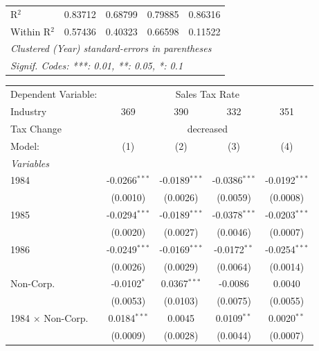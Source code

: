 \documentclass[
  12pt]{article}
\theoremstyle{definition}
\theoremstyle{remark}
\begin{document}
\begin{table}
\begin{minipage}{\linewidth}
\begin{tabular}{lcccc}
   R$^2$                    & 0.83712         & 0.68799        & 0.79885         & 0.86316\\  
   Within R$^2$             & 0.57436         & 0.40323        & 0.66598         & 0.11522\\  
   \midrule \midrule
   \multicolumn{5}{l}{\emph{Clustered (Year) standard-errors in parentheses}}\\
   \multicolumn{5}{l}{\emph{Signif. Codes: ***: 0.01, **: 0.05, *: 0.1}}\\
\end{tabular}
\par\endgroup
\begingroup
\centering
\begin{tabular}{lcccc}
   \tabularnewline \midrule \midrule
   Dependent Variable: & \multicolumn{4}{c}{Sales Tax Rate}\\
   Industry                 & 369             & 390             & 332             & 351 \\   
   Tax Change & \multicolumn{4}{c}{decreased} \\ 
   Model:                   & (1)             & (2)             & (3)             & (4)\\  
   \midrule
   \emph{Variables}\\
   1984                     & -0.0266$^{***}$ & -0.0189$^{***}$ & -0.0386$^{***}$ & -0.0192$^{***}$\\   
                            & (0.0010)        & (0.0026)        & (0.0059)        & (0.0008)\\   
   1985                     & -0.0294$^{***}$ & -0.0189$^{***}$ & -0.0378$^{***}$ & -0.0203$^{***}$\\   
                            & (0.0020)        & (0.0027)        & (0.0046)        & (0.0007)\\   
   1986                     & -0.0249$^{***}$ & -0.0169$^{***}$ & -0.0172$^{**}$  & -0.0254$^{***}$\\   
                            & (0.0026)        & (0.0029)        & (0.0064)        & (0.0014)\\   
   Non-Corp.                & -0.0102$^{*}$   & 0.0367$^{***}$  & -0.0086         & 0.0040\\   
                            & (0.0053)        & (0.0103)        & (0.0075)        & (0.0055)\\   
   1984 $\times$ Non-Corp.  & 0.0184$^{***}$  & 0.0045          & 0.0109$^{**}$   & 0.0020$^{**}$\\   
                            & (0.0009)        & (0.0028)        & (0.0044)        & (0.0007)\\   

\end{tabular}
\end{minipage}
\end{table}
\end{document}
